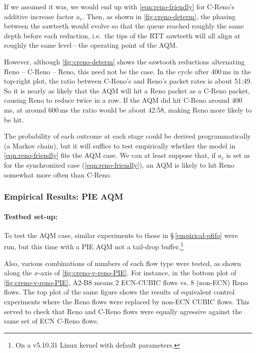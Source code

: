 If we assumed it was, we would end up with \autoref{eqn:reno-friendly} for C-Reno's additive increase factor \(a_c\). Then, as shown in \autoref{fig:creno-determ}, the phasing between the sawteeth would evolve so that the queue reached roughly the same depth before each reduction, i.e.\ the tips of the RTT sawteeth will all align at roughly the same level---the operating point of the AQM. 

However, although \autoref{fig:creno-determ} shows the sawtooth reductions alternating Reno -- C-Reno -- Reno, this need not be the case. In the cycle after 400\,ms in the top-right plot, the ratio between C-Reno's and Reno's packet rates is about 51:49. So it is nearly as likely that the AQM will hit a Reno packet as a C-Reno packet, causing Reno to reduce twice in a row. If the AQM did hit C-Reno around 400\,ms, at around 600\,ms the ratio would be about 42:58, making Reno more likely to be hit. 

The probability of each outcome at each stage could be derived programmatically (a Markov chain), but it will suffice to test empirically whether the model in \autoref{eqn:reno-friendly} fits the AQM case. We can at least suppose that, if \(a_c\) is set as for the synchronized case (\autoref{eqn:reno-friendly}), an AQM is likely to hit Reno somewhat more often than C-Reno.

\subsubsection{Empirical Results: PIE AQM}

\paragraph{Testbed set-up:} To test the AQM case, similar experiments to those in \S\,\ref{empirical-pfifo} were run, but this time with a PIE AQM not a tail-drop buffer.\footnote{On a v5.10.31 Linux kernel with default parameters.}

Also, various combinations of numbers of each flow type were tested, as shown along the \(x\)-axis of \autoref{fig:creno-v-reno-PIE}. For instance, in the bottom plot of \autoref{fig:creno-v-reno-PIE}, A2-B8 means 2 ECN-CUBIC flows vs. 8 (non-ECN) Reno flows. The top plot of the same figure shows the results of equivalent control experiments where the Reno flows were replaced by non-ECN CUBIC flows. This served to check that Reno and C-Reno flows were equally agressive against the same set of ECN C-Reno flows.


